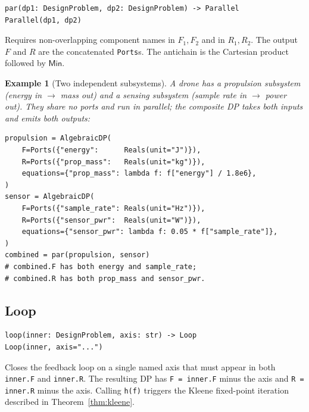 \documentclass[11pt,a4paper]{article}
\newtheorem{example}[definition]{Example}
\newcommand{\Min}{\mathsf{Min}}
\begin{document}
\begin{lstlisting}
par(dp1: DesignProblem, dp2: DesignProblem) -> Parallel
Parallel(dp1, dp2)
\end{lstlisting}

Requires non-overlapping component names in $F_1, F_2$ and in
$R_1, R_2$. The output $F$ and $R$ are the concatenated
\texttt{Ports}s. The antichain is the Cartesian product
followed by $\Min$.

\begin{example}[Two independent subsystems]
A drone has a propulsion subsystem (energy in $\to$ mass out) and a
sensing subsystem (sample rate in $\to$ power out). They share no
ports and run in parallel; the composite DP takes both inputs and
emits both outputs:
\begin{lstlisting}
propulsion = AlgebraicDP(
    F=Ports({"energy":      Reals(unit="J")}),
    R=Ports({"prop_mass":   Reals(unit="kg")}),
    equations={"prop_mass": lambda f: f["energy"] / 1.8e6},
)
sensor = AlgebraicDP(
    F=Ports({"sample_rate": Reals(unit="Hz")}),
    R=Ports({"sensor_pwr":  Reals(unit="W")}),
    equations={"sensor_pwr": lambda f: 0.05 * f["sample_rate"]},
)
combined = par(propulsion, sensor)
# combined.F has both energy and sample_rate;
# combined.R has both prop_mass and sensor_pwr.
\end{lstlisting}
\end{example}

\subsection{Loop}
\label{sec:loop}

\begin{lstlisting}
loop(inner: DesignProblem, axis: str) -> Loop
Loop(inner, axis="...")
\end{lstlisting}

Closes the feedback loop on a single named axis that must appear in
both \texttt{inner.F} and \texttt{inner.R}. The resulting DP has
\texttt{F = inner.F} minus the axis and \texttt{R = inner.R} minus
the axis. Calling \texttt{h(f)} triggers the Kleene fixed-point
iteration described in Theorem~\ref{thm:kleene}.
\end{document}

